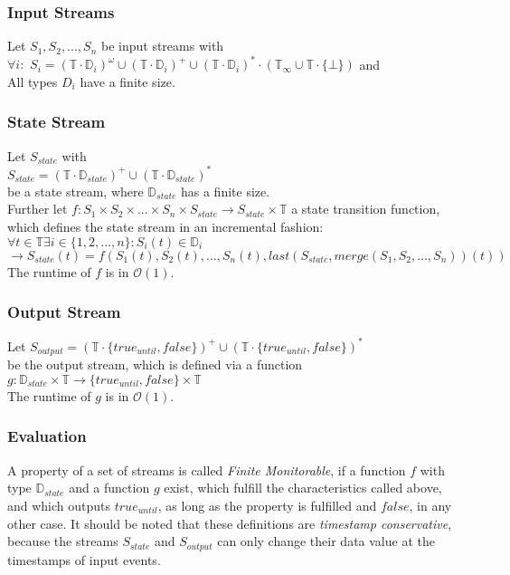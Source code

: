 		\subsubsection{Input Streams}
			Let $S_1, S_2, ..., S_n$ be input streams with\\
			$\forall i:$ $S_i=(\mathbb{T}\cdot \mathbb{D}_i)^\omega\cup(\mathbb{T}\cdot \mathbb{D}_i)^+\cup(\mathbb{T}\cdot \mathbb{D}_i)^*\cdot(\mathbb{T}_\infty\cup\mathbb{T}\cdot\{\bot\})$ and\\
			All types $D_i$ have a finite size.
		\subsubsection{State Stream}
			\label{monitorability_state}
			Let $S_{state}$ with\\
			$S_{state}= (\mathbb{T}\cdot \mathbb{D}_{state})^+\cup(\mathbb{T}\cdot \mathbb{D}_{state})^*$\\
			be a state stream, where $\mathbb{D}_{state}$ has a finite size.\\
			Further let $f: S_1 \times S_2 \times ... \times S_n \times S_{state}\rightarrow S_{state}\times \mathbb{T}$ a state transition function, which defines the state stream in an incremental fashion:\\
			$\forall t\in \mathbb T \exists i\in \{1,2,...,n\}: S_i(t)\in\mathbb D_i$\\
			$\rightarrow S_{state}(t)= f(S_1(t), S_2(t), ..., S_n(t), last(S_{state}, merge(S_1, S_2, ..., S_n))(t))$\\
			The runtime of $f$ is in $\mathcal{O}(1)$.
		\subsubsection{Output Stream}
			Let $S_{output}= (\mathbb{T}\cdot \{true_{until}, false\})^+\cup(\mathbb{T}\cdot \{true_{until}, false\})^*$\\
			be the output stream, which is defined via a function\\
			$g: \mathbb{D}_{state}\times \mathbb{T}\rightarrow \{true_{until}, false\}\times \mathbb{T}$\\
			The runtime of $g$ is in $\mathcal{O}(1)$.
		\subsubsection{Evaluation}
			A property of a set of streams is called \emph{Finite Monitorable}, if a function $f$ with type $\mathbb{D}_{state}$ and a function $g$ exist, which fulfill the characteristics called above, and which outputs $true_{until}$, as long as the property is fulfilled and $false$, in any other case. It should be noted that these definitions are \emph{timestamp conservative}, because the streams $S_{state}$ and $S_{output}$ can only change their data value at the timestamps of input events.
